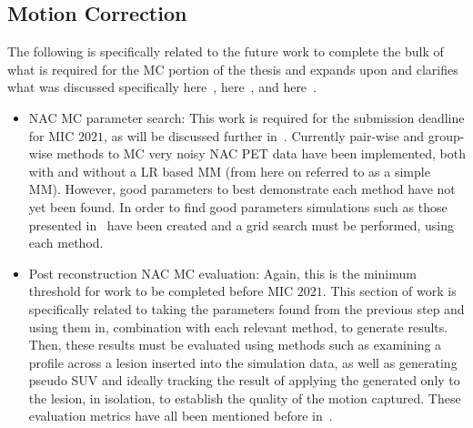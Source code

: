        \subsection{Motion Correction} \label{sec:future_work_motion_correction}
            The following is specifically related to the future work to complete the bulk of what is required for the \gls{MC} portion of the thesis and expands upon and clarifies what was discussed specifically here~, here~, and here~.
            \begin{itemize}
                \item \gls{NAC} \gls{MC} parameter search: This work is required for the submission deadline for \gls{MIC} $2021$, as will be discussed further in~. Currently pair-wise and group-wise methods to \gls{MC} very noisy \gls{NAC} \gls{PET} data have been implemented, both with and without a \gls{LR} based \gls{MM} (from here on referred to as a simple \gls{MM}). However, good parameters to best demonstrate each method have not yet been found. In order to find good parameters simulations such as those presented in~ have been created and a grid search must be performed, using each method.
    
                \item Post reconstruction \gls{NAC} \gls{MC} evaluation: Again, this is the minimum threshold for work to be completed before \gls{MIC} $2021$. This section of work is specifically related to taking the parameters found from the previous step and using them in, combination with each relevant method, to generate results. Then, these results must be evaluated using methods such as examining a profile across a lesion inserted into the simulation data, as well as generating pseudo \gls{SUV} and ideally tracking the result of applying the  generated only to the lesion, in isolation, to establish the quality of the motion captured. These evaluation metrics have all been mentioned before in~.
    

\end{itemize}
